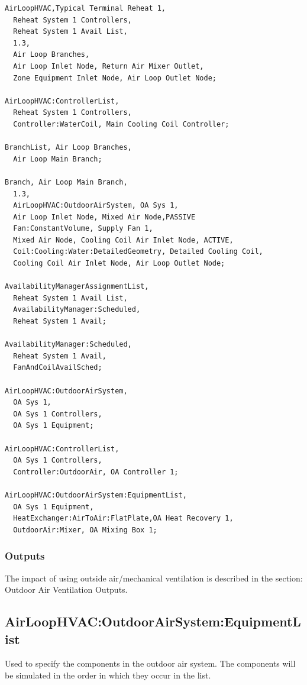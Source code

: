 \begin{lstlisting}
AirLoopHVAC,Typical Terminal Reheat 1,
  Reheat System 1 Controllers,
  Reheat System 1 Avail List,
  1.3,
  Air Loop Branches,
  Air Loop Inlet Node, Return Air Mixer Outlet,
  Zone Equipment Inlet Node, Air Loop Outlet Node;

AirLoopHVAC:ControllerList,
  Reheat System 1 Controllers,
  Controller:WaterCoil, Main Cooling Coil Controller;

BranchList, Air Loop Branches,
  Air Loop Main Branch;

Branch, Air Loop Main Branch,
  1.3,
  AirLoopHVAC:OutdoorAirSystem, OA Sys 1,
  Air Loop Inlet Node, Mixed Air Node,PASSIVE
  Fan:ConstantVolume, Supply Fan 1,
  Mixed Air Node, Cooling Coil Air Inlet Node, ACTIVE,
  Coil:Cooling:Water:DetailedGeometry, Detailed Cooling Coil,
  Cooling Coil Air Inlet Node, Air Loop Outlet Node;

AvailabilityManagerAssignmentList,
  Reheat System 1 Avail List,
  AvailabilityManager:Scheduled,
  Reheat System 1 Avail;

AvailabilityManager:Scheduled,
  Reheat System 1 Avail,
  FanAndCoilAvailSched;

AirLoopHVAC:OutdoorAirSystem,
  OA Sys 1,
  OA Sys 1 Controllers,
  OA Sys 1 Equipment;

AirLoopHVAC:ControllerList,
  OA Sys 1 Controllers,
  Controller:OutdoorAir, OA Controller 1;

AirLoopHVAC:OutdoorAirSystem:EquipmentList,
  OA Sys 1 Equipment,
  HeatExchanger:AirToAir:FlatPlate,OA Heat Recovery 1,
  OutdoorAir:Mixer, OA Mixing Box 1;
\end{lstlisting}

\subsubsection{Outputs}\label{outputs-2-001}

The impact of using outside air/mechanical ventilation is described in the section: Outdoor Air Ventilation Outputs.

\subsection{AirLoopHVAC:OutdoorAirSystem:EquipmentList}\label{airloophvacoutdoorairsystemequipmentlist}

Used to specify the components in the outdoor air system. The components will be simulated in the order in which they occur in the list.

